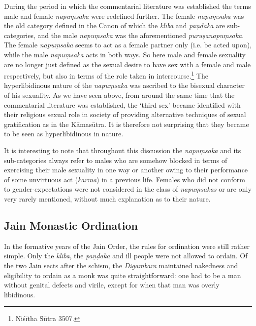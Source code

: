 During the period in which the commentarial literature was established the terms male and female {\em napuṃsaka} were redefined further. The female {\em napuṃsaka} was the old category defined in the Canon of which the {\em klība} and {\em paṇḍaka} are sub-categories, and the male {\em napuṃsaka} was the aforementioned {\em puruṣanapuṃsaka}. The female {\em napuṃsaka} seems to act as a female partner only (i.e. be acted upon), while the male {\em napuṃsaka} acts in both ways. So here male and female sexuality are no longer just defined as the sexual desire to have sex with a female and male respectively, but also in terms of the role taken in intercourse.\footnote{Niśītha Sūtra 3507.} The hyperlibidinous nature of the {\em napuṃsaka} was ascribed to the bisexual character of his sexuality. As we have seen above, from around the same time that the commentarial literature was established, the `third sex' became identified with their religious sexual role in society of providing alternative techniques of sexual gratification as in the Kāmasūtra. It is therefore not surprising that they became to be seen as hyperlibidinous in nature.

It is interesting to note that throughout this discussion the {\em napuṃsaka} and its sub-categories always refer to males who are somehow blocked in terms of exercising their male sexuality in one way or another owing to their performance of some unvirtuous act ({\em karma}) in a previous life. Females who did not conform to gender-expectations were not considered in the class of {\em napuṃsakas} or are only very rarely mentioned, without much explanation as to their nature. 

\subsection{Jain Monastic Ordination}
In the formative years of the Jain Order, the rules for ordination were still rather simple. Only the {\em klība}, the {\em paṇḍaka} and ill people were not allowed to ordain. Of the two Jain sects after the schism, the {\em Digambara} maintained nakedness and eligibility to ordain as a monk was quite straightforward: one had to be a man without genital defects and virile, except for when that man was overly libidinous. 

